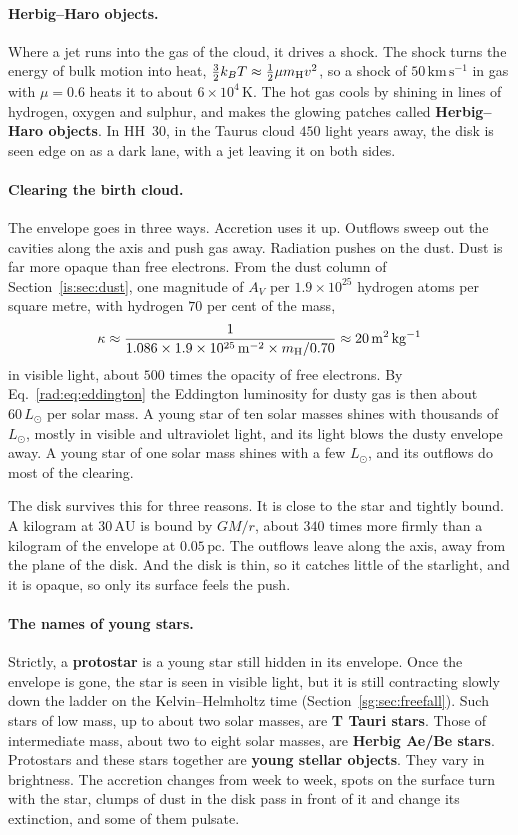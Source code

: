 \paragraph{Herbig--Haro objects.} Where a jet runs into the gas of the cloud, it drives a shock. The shock turns the energy of bulk motion into heat, $\tfrac32k_BT\approx\tfrac12\mu m_{\rm H}v^2$, so a shock of $50\,\mathrm{km\,s^{-1}}$ in gas with $\mu=0.6$ heats it to about $6\times10^4\,\mathrm K$. The hot gas cools by shining in lines of hydrogen, oxygen and sulphur, and makes the glowing patches called \textbf{Herbig--Haro objects}. In HH~30, in the Taurus cloud $450$ light years away, the disk is seen edge on as a dark lane, with a jet leaving it on both sides.

\paragraph{Clearing the birth cloud.} The envelope goes in three ways. Accretion uses it up. Outflows sweep out the cavities along the axis and push gas away. Radiation pushes on the dust. Dust is far more opaque than free electrons. From the dust column of Section~\ref{is:sec:dust}, one magnitude of $A_V$ per $1.9\times10^{25}$ hydrogen atoms per square metre, with hydrogen $70$ per cent of the mass,
\[
\kappa\approx\frac{1}{1.086\times1.9\times10^{25}\,\mathrm{m^{-2}}\times m_{\rm H}/0.70}\approx20\,\mathrm{m^2\,kg^{-1}}
\]
in visible light, about $500$ times the opacity of free electrons. By Eq.~\eqref{rad:eq:eddington} the Eddington luminosity for dusty gas is then about $60\,L_\odot$ per solar mass. A young star of ten solar masses shines with thousands of $L_\odot$, mostly in visible and ultraviolet light, and its light blows the dusty envelope away. A young star of one solar mass shines with a few $L_\odot$, and its outflows do most of the clearing.

The disk survives this for three reasons. It is close to the star and tightly bound. A kilogram at $30\,\mathrm{AU}$ is bound by $GM/r$, about $340$ times more firmly than a kilogram of the envelope at $0.05\,\mathrm{pc}$. The outflows leave along the axis, away from the plane of the disk. And the disk is thin, so it catches little of the starlight, and it is opaque, so only its surface feels the push.

\paragraph{The names of young stars.} Strictly, a \textbf{protostar} is a young star still hidden in its envelope. Once the envelope is gone, the star is seen in visible light, but it is still contracting slowly down the ladder on the Kelvin--Helmholtz time (Section~\ref{sg:sec:freefall}). Such stars of low mass, up to about two solar masses, are \textbf{T Tauri stars}. Those of intermediate mass, about two to eight solar masses, are \textbf{Herbig Ae/Be stars}. Protostars and these stars together are \textbf{young stellar objects}. They vary in brightness. The accretion changes from week to week, spots on the surface turn with the star, clumps of dust in the disk pass in front of it and change its extinction, and some of them pulsate.

